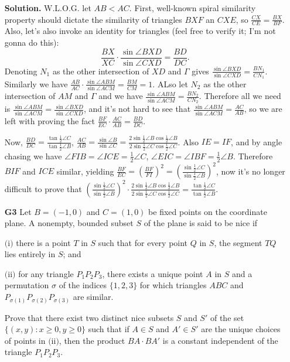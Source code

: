 \documentclass[11pt,a4paper]{article}
\begin{document}
\begin{itemize}
\textbf{Solution.}
W.L.O.G. let $AB<AC$. 
First, well-known spiral similarity property should dictate the similarity of triangles $BXF$ an $CXE$, so $\frac{CX}{CE}=\frac{BX}{BF}$.
Also, let's also invoke an identity for triangles (feel free to verify it; I'm not gonna do this):
$$\frac{BX}{XC}\cdot \frac{\sin\angle BXD}{\sin\angle CXD}=\frac{BD}{DC}.$$Denoting $N_1$ as the other intersection of $XD$ and $\Gamma$ gives $\frac{\sin\angle BXD}{\sin\angle CXD}=\frac{BN_1}{CN_1}.$
Similarly we have $\frac{AB}{AC}\cdot \frac{\sin\angle ABM}{\sin\angle ACM}=\frac{BM}{CM}=1$.
ALso let $N_2$ as the other intersection of $AM$ and $\Gamma$ and we have $\frac{\sin\angle ABM}{\sin\angle ACM}=\frac{BN_2}{CN_2}.$
Therefore all we need is $\frac{\sin\angle ABM}{\sin\angle ACM}=\frac{\sin\angle BXD}{\sin\angle CXD}$,
and it's not hard to see that $\frac{\sin\angle ABM}{\sin\angle ACM}=\frac{AC}{AB}$,
so we are left with proving the fact
$\frac{BF}{EC}\cdot\frac{AC}{AB}=\frac{BD}{DC}$.

Now, $\frac{BD}{DC}=\frac{\tan\frac12\angle C}{\tan\frac12\angle B}$,
$\frac{AC}{AB}=\frac{\sin\angle B}{\sin\angle C}=\frac{2\sin\frac 12\angle B\cos\frac 12\angle B}{2\sin\frac 12\angle C\cos\frac 12\angle C}$.
Also $IE=IF$, and by angle chasing we have $\angle FIB=\angle ICE=\frac12\angle C$,
$\angle EIC=\angle IBF=\frac12\angle B$.
Therefore $BIF$ and $ICE$ similar, yielding $\frac{BF}{EC}=(\frac{BF}{FI})^2=(\frac{\sin\frac12\angle C}{\sin\frac12\angle B})^2$,
now it's no longer difficult to prove that $(\frac{\sin\frac12\angle C}{\sin\frac12\angle B})^2\cdot \frac{2\sin\frac 12\angle B\cos\frac 12\angle B}{2\sin\frac 12\angle C\cos\frac 12\angle C}=\frac{\tan\frac12\angle C}{\tan\frac12\angle B}$.

\item[\textbf{G3}]
Let $B = (-1, 0)$ and $C = (1, 0)$ be fixed points on the coordinate plane. A nonempty, bounded subset $S$ of the plane is said to be nice if

$\text{(i)}$ there is a point $T$ in $S$ such that for every point $Q$ in $S$, the segment $TQ$ lies entirely in $S$; and

$\text{(ii)}$ for any triangle $P_1P_2P_3$, there exists a unique point $A$ in $S$ and a permutation $\sigma$ of the indices $\{1, 2, 3\}$ for which triangles $ABC$ and $P_{\sigma(1)}P_{\sigma(2)}P_{\sigma(3)}$ are similar.

Prove that there exist two distinct nice subsets $S$ and $S'$ of the set $\{(x, y) : x \geq 0, y \geq 0\}$ such that if $A \in S$ and $A' \in S'$ are the unique choices of points in $\text{(ii)}$, then the product $BA \cdot BA'$ is a constant independent of the triangle $P_1P_2P_3$.


\end{itemize}
\end{document}
